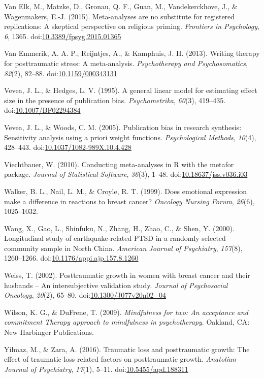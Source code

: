 \documentclass[english,man, mask]{apa6}
\theoremstyle{definition}
\theoremstyle{definition}
\theoremstyle{definition}
\theoremstyle{remark}
\begin{document}
\hypertarget{ref-VanElk2015}{}
Van Elk, M., Matzke, D., Gronau, Q. F., Guan, M., Vandekerckhove, J., \&
Wagenmakers, E.-J. (2015). Meta-analyses are no substitute for
registered replications: A skeptical perspective on religious priming.
\emph{Frontiers in Psychology}, \emph{6}, 1365.
doi:\href{https://doi.org/10.3389/fpsyg.2015.01365}{10.3389/fpsyg.2015.01365}

\hypertarget{ref-VanEmmerik2013}{}
Van Emmerik, A. A. P., Reijntjes, A., \& Kamphuis, J. H. (2013). Writing
therapy for posttraumatic stress: A meta-analysis. \emph{Psychotherapy
and Psychosomatics}, \emph{82}(2), 82--88.
doi:\href{https://doi.org/10.1159/000343131}{10.1159/000343131}

\hypertarget{ref-Vevea1995}{}
Vevea, J. L., \& Hedges, L. V. (1995). A general linear model for
estimating effect size in the presence of publication bias.
\emph{Psychometrika}, \emph{60}(3), 419--435.
doi:\href{https://doi.org/10.1007/BF02294384}{10.1007/BF02294384}

\hypertarget{ref-Vevea2005}{}
Vevea, J. L., \& Woods, C. M. (2005). Publication bias in research
synthesis: Sensitivity analysis using a priori weight functions.
\emph{Psychological Methods}, \emph{10}(4), 428--443.
doi:\href{https://doi.org/10.1037/1082-989X.10.4.428}{10.1037/1082-989X.10.4.428}

\hypertarget{ref-Viechtbauer2010}{}
Viechtbauer, W. (2010). Conducting meta-analyses in R with the metafor
package. \emph{Journal of Statistical Software}, \emph{36}(3), 1--48.
doi:\href{https://doi.org/10.18637/jss.v036.i03}{10.18637/jss.v036.i03}

\hypertarget{ref-Walker1999a}{}
Walker, B. L., Nail, L. M., \& Croyle, R. T. (1999). Does emotional
expression make a difference in reactions to breast cancer?
\emph{Oncology Nursing Forum}, \emph{26}(6), 1025--1032.

\hypertarget{ref-Wang2000}{}
Wang, X., Gao, L., Shinfuku, N., Zhang, H., Zhao, C., \& Shen, Y.
(2000). Longitudinal study of earthquake-related PTSD in a randomly
selected community sample in North China. \emph{American Journal of
Psychiatry}, \emph{157}(8), 1260--1266.
doi:\href{https://doi.org/10.1176/appi.ajp.157.8.1260}{10.1176/appi.ajp.157.8.1260}

\hypertarget{ref-Weiss2002}{}
Weiss, T. (2002). Posttraumatic growth in women with breast cancer and
their husbands -- An intersubjective validation study. \emph{Journal of
Psychosocial Oncology}, \emph{20}(2), 65--80.
doi:\href{https://doi.org/10.1300/J077v20n02_04}{10.1300/J077v20n02\_04}

\hypertarget{ref-Wilson2009}{}
Wilson, K. G., \& DuFrene, T. (2009). \emph{Mindfulness for two: An
acceptance and commitment Therapy approach to mindfulness in
psychotherapy}. Oakland, CA: New Harbinger Publications.

\hypertarget{ref-Yilmaz2016}{}
Yilmaz, M., \& Zara, A. (2016). Traumatic loss and posttraumatic growth:
The effect of traumatic loss related factors on posttraumatic growth.
\emph{Anatolian Journal of Psychiatry}, \emph{17}(1), 5--11.
doi:\href{https://doi.org/10.5455/apd.188311}{10.5455/apd.188311}
\end{document}

